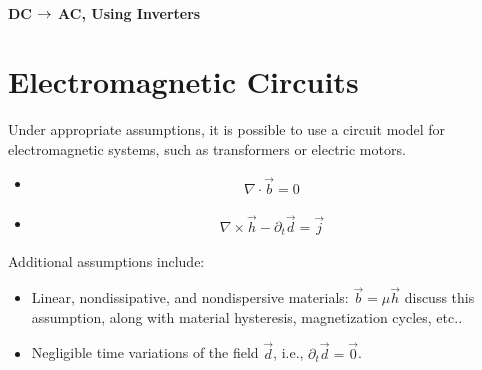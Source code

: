 \documentclass[letterpaper,10pt,english]{jupyterBook}
\begin{document}
\subsubsection{DC \protect\(\rightarrow\protect\) AC, Using Inverters}
\label{\detokenize{ch/circuits-electric-regimes:dc-rightarrow-ac-using-inverters}}\label{\detokenize{ch/circuits-electric-regimes:physics-hs-electromagnetism-circuits-electric-regimes-conversion-inverter}}
\sphinxstepscope


\chapter{Electromagnetic Circuits}
\label{\detokenize{ch/circuits-electromagnetic:electromagnetic-circuits}}\label{\detokenize{ch/circuits-electromagnetic:classical-electromagnetism-circuits-electromagnetic}}\label{\detokenize{ch/circuits-electromagnetic::doc}}
\sphinxAtStartPar
Under appropriate assumptions, it is possible to use a circuit model for electromagnetic systems, such as transformers or electric motors.
\begin{itemize}
\item {} 
\sphinxAtStartPar
{}
\begin{equation*}
\begin{split}\nabla \cdot \vec{b} = 0\end{split}
\end{equation*}
\item {} 
\sphinxAtStartPar
{}
\begin{equation*}
\begin{split}\nabla \times \vec{h} - \partial_t \vec{d} = \vec{j}\end{split}
\end{equation*}
\end{itemize}

\sphinxAtStartPar
Additional assumptions include:
\begin{itemize}
\item {} 
\sphinxAtStartPar
Linear, non\sphinxhyphen{}dissipative, and non\sphinxhyphen{}dispersive materials: \(\vec{b} = \mu \vec{h}\)  discuss this assumption, along with material hysteresis, magnetization cycles, etc..

\item {} 
\sphinxAtStartPar
Negligible time variations of the field \(\vec{d}\), i.e., \(\partial_t \vec{d} = \vec{0}\).

\end{itemize}
\end{document}
